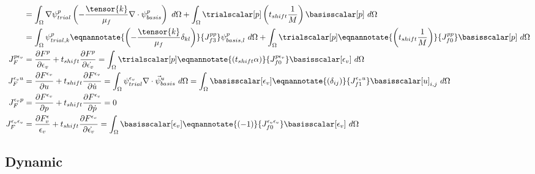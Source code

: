 \begin{align}
&= \int_{\Omega} \nabla \psi_{trial}^ p \left(-\frac{\tensor{k}}{\mu_{f}} \nabla \cdot \psi_{basis}^p \right) \ d\Omega +
 \int_{\Omega} \trialscalar[p] \left(t_{shift} \frac{1}{M}\right) \basisscalar[p] \ d\Omega \\
&= \int_{\Omega} \psi_{trial,k}^p \eqnannotate{\left(-\frac{\tensor{k}}{\mu_{f}} \delta_{kl}\right)}{J_{f3}^{pp}} \psi_{basis,l}^p \ d\Omega +
\int_{\Omega} \trialscalar[p] \eqnannotate{\left(t_{shift} \frac{1}{M}\right)}{J_{f0}^{pp}} \basisscalar[p] \ d\Omega \\
%
J_F^{p\epsilon_{v}} &= \frac{\partial F^p}{\partial \epsilon_{v}} + t_{shift} \frac{\partial
F^p}{\partial \dot{\epsilon_{v}}} = \int_{\Omega} \trialscalar[p] \eqnannotate{\left(t_{shift} \alpha \right)}{J_{f0}^{p\epsilon_{v}}}
\basisscalar[\epsilon_{v}] \ d\Omega \\
%
J_F^{\epsilon_{v}u} &= \frac{\partial F^{\epsilon_{v}}}{\partial u} + t_{shift} \frac{\partial F^{\epsilon_{v}}}{\partial \dot{u}} =
\int_{\Omega} \psi_{trial}^{\epsilon_{v}} \nabla \cdot \vec{\psi}_{basis}^u \ d\Omega = \int_{\Omega}
\basisscalar[\epsilon_{v}] \eqnannotate{\left(\delta_{ij}\right)}{J_{f1}^{\epsilon_{v}u}}
\basisscalar[u]_{i,j} \ d\Omega\\
%
%
J_F^{\epsilon_{v}p} &= \frac{\partial F^{\epsilon_{v}}}{\partial p} + t_{shift} \frac{\partial F^{\epsilon_{v}}}{\partial \dot{p}} = 0 \\
%
%
J_F^{\epsilon_{v}\epsilon_{v}} &= \frac{\partial F^\epsilon_{v}}{\epsilon_{v}} + t_{shift} \frac{\partial F^{\epsilon_{v}}}{\partial \dot{\epsilon_{v}}} =
\int_{\Omega} \basisscalar[\epsilon_{v}] \eqnannotate{\left(-1\right)}{J_{f0}^{\epsilon_{v}\epsilon_{v}}} \basisscalar[\epsilon_{v}] \ d\Omega
\end{align}

\subsection{Dynamic}

